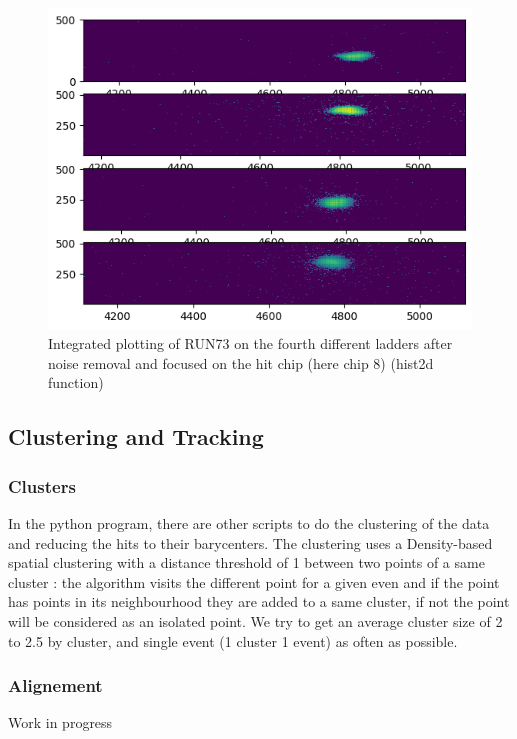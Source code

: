\documentclass[12pt,oneside,a4]{article}
\begin{document}
    \begin{figure}[h]
        \centering
        \includegraphics[scale =0.5]{figures/With_noise_removal_and_chip_focus.png}
        \caption{Integrated plotting of RUN73 on the fourth different ladders after noise removal and focused on the hit chip (here chip 8) (hist2d function)}
        \label{fig:13}
    \end{figure}
\newpage
    \subsection{Clustering and Tracking}
    \subsubsection{Clusters}
    In the python program, there are other scripts to do the clustering of the data and reducing the hits to their barycenters. 
    The clustering uses a Density-based spatial clustering with a distance threshold of 1 between two points of a same cluster : the algorithm visits the different point for a given even and if the point has points in its neighbourhood they are added to a same cluster, if not the point will be considered as an isolated point. 
    We try to get an average cluster size of 2 to 2.5 by cluster, and single event (1 cluster 1 event) as often as possible. 
    \subsubsection{Alignement}
    Work in progress
    
\end{document}
